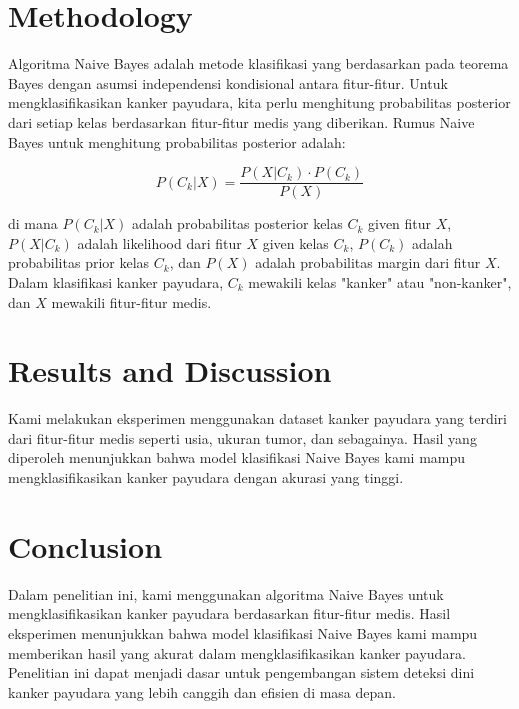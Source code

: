 \documentclass[conference]{IEEEtran}
\begin{document}
\section{Methodology} \label{sec:methodology}
Algoritma Naive Bayes adalah metode klasifikasi yang berdasarkan pada teorema Bayes dengan asumsi independensi kondisional antara fitur-fitur. Untuk mengklasifikasikan kanker payudara, kita perlu menghitung probabilitas posterior dari setiap kelas berdasarkan fitur-fitur medis yang diberikan. Rumus Naive Bayes untuk menghitung probabilitas posterior adalah:

\begin{equation}
P(C_k|X) = \frac{P(X|C_k) \cdot P(C_k)}{P(X)}
\end{equation}

di mana $P(C_k|X)$ adalah probabilitas posterior kelas $C_k$ given fitur $X$, $P(X|C_k)$ adalah likelihood dari fitur $X$ given kelas $C_k$, $P(C_k)$ adalah probabilitas prior kelas $C_k$, dan $P(X)$ adalah probabilitas margin dari fitur $X$. Dalam klasifikasi kanker payudara, $C_k$ mewakili kelas "kanker" atau "non-kanker", dan $X$ mewakili fitur-fitur medis.

\section{Results and Discussion} \label{sec:result}
Kami melakukan eksperimen menggunakan dataset kanker payudara yang terdiri dari fitur-fitur medis seperti usia, ukuran tumor, dan sebagainya. Hasil yang diperoleh menunjukkan bahwa model klasifikasi Naive Bayes kami mampu mengklasifikasikan kanker payudara dengan akurasi yang tinggi.

\section{Conclusion} \label{sec:conclusion}
Dalam penelitian ini, kami menggunakan algoritma Naive Bayes untuk mengklasifikasikan kanker payudara berdasarkan fitur-fitur medis. Hasil eksperimen menunjukkan bahwa model klasifikasi Naive Bayes kami mampu memberikan hasil yang akurat dalam mengklasifikasikan kanker payudara. Penelitian ini dapat menjadi dasar untuk pengembangan sistem deteksi dini kanker payudara yang lebih canggih dan efisien di masa depan.



\end{document}
